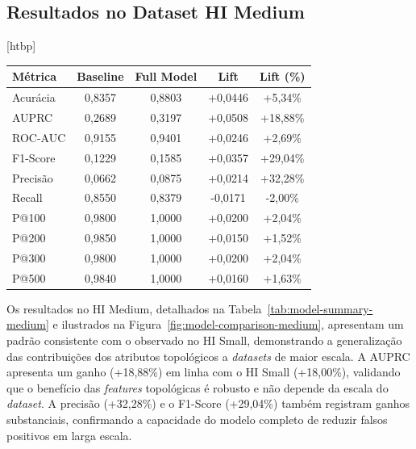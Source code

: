 \documentclass[a4paper,12pt,oneside,onecolumn,final,fleqn]{repUERJ}
\makeatletter
\renewenvironment{table}[1][htbp]
  {\@float{table}[#1]\centering}
  {\end@float}
\makeatother
\begin{document}
\subsection{Resultados no Dataset HI Medium}

\begin{table}
    \centering
    \caption{Desempenho dos modelos no dataset HI Medium}
    \label{tab:model-summary-medium}
    \begin{tabular}{lcccc}
        \hline
        \textbf{Métrica} & \textbf{Baseline} & \textbf{Full Model} & \textbf{Lift} & \textbf{Lift (\%)} \\
        \hline
        Acurácia  & 0,8357 & 0,8803 & +0,0446 & +5,34\%  \\
        AUPRC     & 0,2689 & 0,3197 & +0,0508 & +18,88\% \\
        ROC-AUC   & 0,9155 & 0,9401 & +0,0246 & +2,69\%  \\
        F1-Score  & 0,1229 & 0,1585 & +0,0357 & +29,04\% \\
        Precisão  & 0,0662 & 0,0875 & +0,0214 & +32,28\% \\
        Recall    & 0,8550 & 0,8379 & -0,0171 & -2,00\%  \\ \hline
        P@100     & 0,9800 & 1,0000 & +0,0200 & +2,04\%  \\
        P@200     & 0,9850 & 1,0000 & +0,0150 & +1,52\%  \\
        P@300     & 0,9800 & 1,0000 & +0,0200 & +2,04\%  \\
        P@500     & 0,9840 & 1,0000 & +0,0160 & +1,63\%  \\ \hline
    \end{tabular}
\end{table}

Os resultados no HI Medium, detalhados na Tabela~\ref{tab:model-summary-medium} e ilustrados na Figura~\ref{fig:model-comparison-medium}, apresentam um padrão consistente com o observado no HI Small, demonstrando a generalização das contribuições dos atributos topológicos a \textit{datasets} de maior escala. A AUPRC apresenta um ganho (+18,88\%) em linha com o HI Small (+18,00\%), validando que o benefício das \textit{features} topológicas é robusto e não depende da escala do \textit{dataset}. A precisão (+32,28\%) e o F1-Score (+29,04\%) também registram ganhos substanciais, confirmando a capacidade do modelo completo de reduzir falsos positivos em larga escala.
\end{document}
